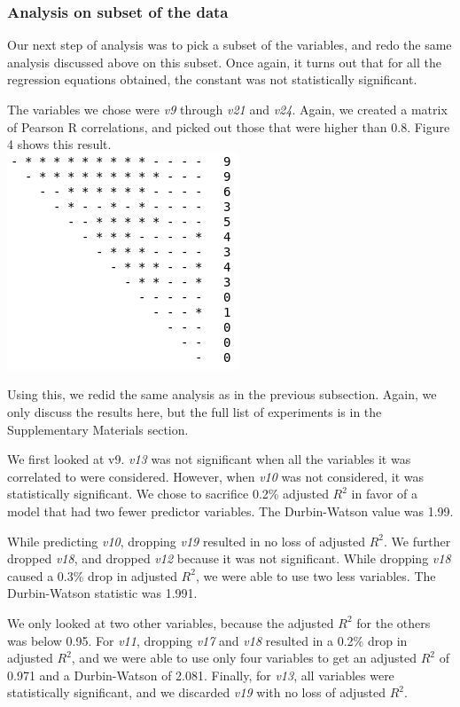 \documentclass[12pt,a4paper,twocolumn]{article}
\begin{document}
	\subsubsection{Analysis on subset of the data}
	Our next step of analysis was to pick a subset of the variables, and redo the same analysis discussed above on this subset. Once again, it turns out that for all the regression equations obtained, the constant was not statistically significant.
	
	The variables we chose were \textit{v9} through \textit{v21} and \textit{v24}. Again, we created a matrix of Pearson R correlations, and picked out those that were higher than 0.8. Figure 4 shows this result. \\
	
	\includegraphics[scale=0.6]{fig4.png}
	\begingroup
	\endgroup
	\hfill\break
	
	Using this, we redid the same analysis as in the previous subsection. Again, we only discuss the results here, but the full list of experiments is in the Supplementary Materials section.
	
	We first looked at v9. \textit{v13} was not significant when all the variables it was correlated to were considered. However, when \textit{v10} was not considered, it was statistically significant. We chose to sacrifice 0.2\% adjusted $R^2$ in favor of a model that had two fewer predictor variables. The Durbin-Watson value was 1.99.
	
	While predicting \textit{v10}, dropping \textit{v19} resulted in no loss of adjusted $R^2$. We further dropped \textit{v18}, and dropped \textit{v12} because it was not significant. While dropping \textit{v18} caused a 0.3\% drop in adjusted $R^2$, we were able to use two less variables. The Durbin-Watson statistic was 1.991.
	
	We only looked at two other variables, because the adjusted $R^2$ for the others was below 0.95. For \textit{v11}, dropping \textit{v17} and \textit{v18} resulted in a 0.2\% drop in adjusted $R^2$, and we were able to use only four variables to get an adjusted $R^2$ of 0.971 and a Durbin-Watson of 2.081. Finally, for \textit{v13}, all variables were statistically significant, and we discarded \textit{v19} with no loss of adjusted $R^2$.
	
\end{document}
